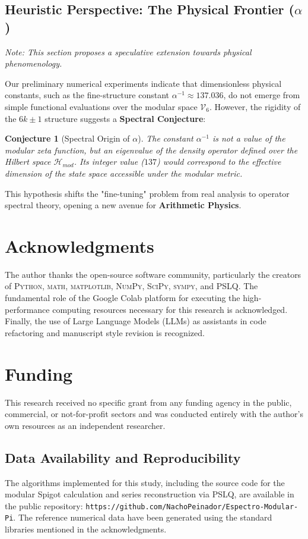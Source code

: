 \documentclass[12pt, a4paper]{article}
\theoremstyle{plain}
\newtheorem{conjecture}[theorem]{Conjecture}
\theoremstyle{definition}
\theoremstyle{remark}
\numberwithin{equation}{section}
\begin{document}
\subsection{Heuristic Perspective: The Physical Frontier ($\alpha$)}
\textit{Note: This section proposes a speculative extension towards physical phenomenology.}

Our preliminary numerical experiments indicate that dimensionless physical constants, such as the fine-structure constant $\alpha^{-1} \approx 137.036$, do not emerge from simple functional evaluations over the modular space $\mathcal{V}_6$.
However, the rigidity of the $6k \pm 1$ structure suggests a \textbf{Spectral Conjecture}:
\begin{conjecture}[Spectral Origin of $\alpha$]
The constant $\alpha^{-1}$ is not a value of the modular zeta function, but an eigenvalue of the density operator defined over the Hilbert space $\mathcal{H}_{mod}$. Its integer value ($137$) would correspond to the effective dimension of the state space accessible under the modular metric.
\end{conjecture}
This hypothesis shifts the "fine-tuning" problem from real analysis to operator spectral theory, opening a new avenue for \textbf{Arithmetic Physics}.

\section*{Acknowledgments}
The author thanks the open-source software community, particularly the creators of \textsc{Python}, \textsc{math}, \textsc{matplotlib}, \textsc{NumPy}, \textsc{SciPy}, \textsc{sympy}, and \textsc{PSLQ}. The fundamental role of the Google Colab platform for executing the high-performance computing resources necessary for this research is acknowledged. Finally, the use of Large Language Models (LLMs) as assistants in code refactoring and manuscript style revision is recognized.

\section*{Funding}
This research received no specific grant from any funding agency in the public, commercial, or not-for-profit sectors and was conducted entirely with the author's own resources as an independent researcher.

\subsection*{Data Availability and Reproducibility}
The algorithms implemented for this study, including the source code for the modular Spigot calculation and series reconstruction via PSLQ, are available in the public repository: \texttt{https://github.com/NachoPeinador/Espectro-Modular-Pi}. The reference numerical data have been generated using the standard libraries mentioned in the acknowledgments.
\end{document}

